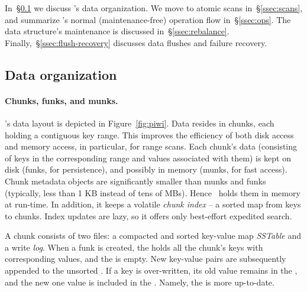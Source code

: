 

In~\S\ref{ssec:layout} we discuss \sys's data organization. 
We move to atomic scans in~\S\ref{ssec:scans}, and summarize \sys's
normal (maintenance-free) operation flow in~\S\ref{ssec:ops}.  
The data structure's maintenance is discussed in~\S\ref{ssec:rebalance}.
Finally,~\S\ref{ssec:flush-recovery} discusses data flushes and failure recovery.


\subsection{Data organization}
\label{ssec:layout}

\paragraph{Chunks, funks, and munks.}

\sys's data layout is depicted in Figure~\ref{fig:piwi}.
Data resides in chunks, each holding a contiguous key range.
This improves the efficiency of both disk access and memory access, in particular, for  range scans. 
Each chunk's data 
(consisting of keys in the corresponding range and values associated with them) 
is kept on disk (funks, for persistence), and possibly in memory (munks, for fast access). 
Chunk metadata objects are significantly smaller than munks and funks
(typically, less than 1 KB instead of tens of MBs). Hence \sys\ holds them in memory at run-time.
In addition, it keeps a volatile \emph{chunk index} -- a sorted map from keys to chunks. 
Index updates are lazy, so it offers only best-effort expedited search.

A chunk %
consists of two files:  a compacted and sorted  key-value map \emph{SSTable} %
and a write \emph{log}. When a funk is created, the  holds all the chunk's keys with corresponding values, and the   is empty.
New key-value pairs are subsequently appended to the unsorted . If a key is over-written, its old value remains in the , and the new one value is included in the .
Namely, the  is more up-to-date.


